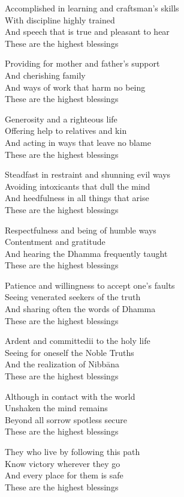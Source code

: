 Accomplished in learning and craftsman’s skills\\
With discipline highly trained\\
And speech that is true and pleasant to hear\\
These are the highest blessings

Providing for mother and father’s support\\
And cherishing family\\
And ways of work that harm no being\\
These are the highest blessings

Generosity and a righteous life\\
Offering help to relatives and kin\\
And acting in ways that leave no blame\\
These are the highest blessings

Steadfast in restraint and shunning evil ways\\
Avoiding intoxicants that dull the mind\\
And heedfulness in all things that arise\\
These are the highest blessings

Respectfulness and being of humble ways\\
Contentment and gratitude\\
And hearing the Dhamma frequently taught\\
These are the highest blessings

Patience and willingness to accept one’s faults\\
Seeing venerated seekers of the truth\\
And sharing often the words of Dhamma\\
These are the highest blessings

Ardent and committedii to the holy life\\
Seeing for oneself the Noble Truths\\
And the realization of Nibbāna\\
These are the highest blessings

Although in contact with the world\\
Unshaken the mind remains\\
Beyond all sorrow spotless secure\\
These are the highest blessings

They who live by following this path\\
Know victory wherever they go\\
And every place for them is safe\\
These are the highest blessings

